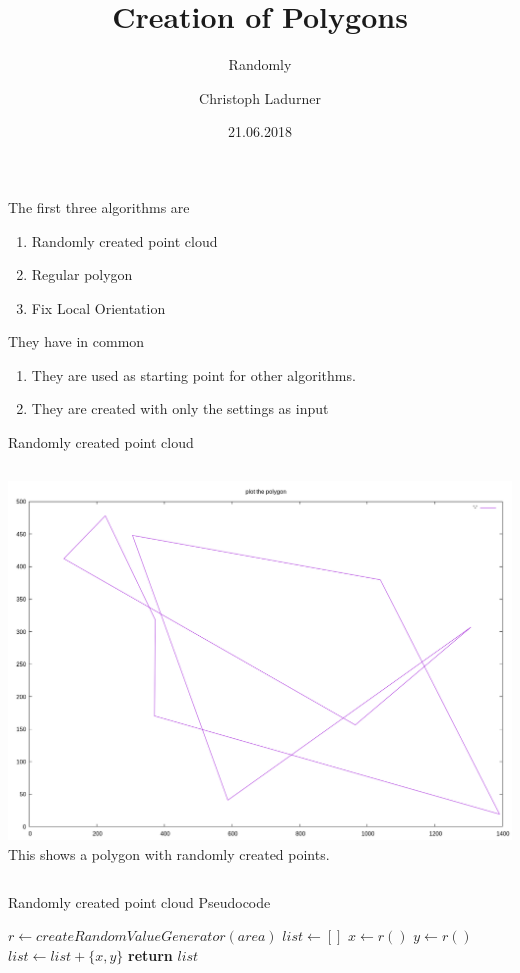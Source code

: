 \documentclass{beamer}
\title{Creation of Polygons}
\subtitle{Randomly}
\author{Christoph Ladurner}
\date{21.06.2018}
\begin{document}
\begin{frame}
  \titlepage
\end{frame}

\begin{frame}
  The first three algorithms are
  \begin{enumerate}
    \item Randomly created point cloud
    \item Regular polygon
    \item Fix Local Orientation
  \end{enumerate}

  They have in common
  \begin{enumerate}
    \item They are used as starting point for other algorithms.
    \item They are created with only the settings as input
  \end{enumerate}
\end{frame}

\begin{frame}{Randomly created point cloud}
  \begin{block}{}
    \begin{columns}[onlytextwidth,T]
      \column{\dimexpr\linewidth-40mm}
      \includegraphics[width=0.5\paperwidth]{figures/kk-random-10-0-0.png}
      \column{40mm}
      This shows a polygon with randomly created points.
    \end{columns}
  \end{block}
\end{frame}

\begin{frame}{Randomly created point cloud Pseudocode}
  \begin{algorithm}[H]
    \begin{algorithmic}[0]
        \State $r\gets createRandomValueGenerator(area)$
        \State $list \gets []$
          \State $x \gets r()$
          \State $y \gets r()$
          \State $list \gets list + \{x,y\}$
        \EndFor
        \State \textbf{return} $list$
      \EndProcedure
    \end{algorithmic}
  \end{algorithm}
\end{frame}
\end{document}
